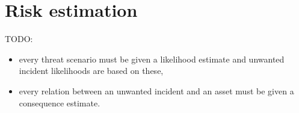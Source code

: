 \section{Risk estimation}

TODO:
\begin{itemize}
    \item every threat scenario must be given a likelihood
estimate and unwanted incident likelihoods are based
on these,
    \item every relation between an unwanted incident and an
asset must be given a consequence estimate.
\end{itemize}